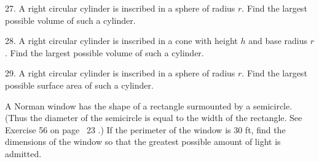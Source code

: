 \documentclass{sebase}
\begin{document}
\begin{multicols}{2}
\begin{ExerciseList}
\item[\hfill 27.] A right circular cylinder is inscribed in a sphere of
radius $r$. Find the largest possible volume of such a cylinder.

%

%

\item[\hfill 28.] A right circular cylinder is inscribed in a cone with
height $h$ and base radius $r$. Find the largest possible volume of such a
cylinder.

%

\item[\hfill 29.] A right circular cylinder is inscribed in a sphere of
radius $r$. Find the largest possible surface area of such a cylinder.

%

%

\item[{\hfill {\protect\fbox{\hspace{-2pt}30.\hspace{-2pt}}}}] A Norman
window has the shape of a rectangle surmounted by a semicircle. (Thus the
diameter of the semicircle is equal to the width of the rectangle. See
Exercise 56 on page~%
23%
.) If the perimeter of the window is 30 ft, find the dimensions of the
window so that the greatest possible amount of light is admitted.

%


\end{ExerciseList}
\end{multicols}
\end{document}

